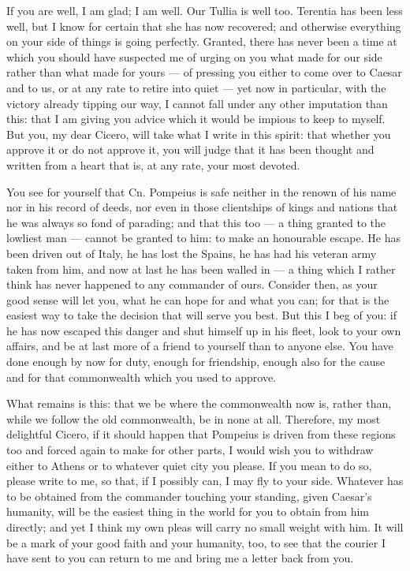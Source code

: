 

 If you are well, I am glad; I am well. Our Tullia is well too. Terentia has been less well, but I know for certain that she has now recovered; and otherwise everything on your side of things is going perfectly. Granted, there has never been a time at which you should have suspected me of urging on you what made for our side rather than what made for yours --- of pressing you either to come over to Caesar and to us, or at any rate to retire into quiet --- yet now in particular, with the victory already tipping our way, I cannot fall under any other imputation than this: that I am giving you advice which it would be impious to keep to myself. But you, my dear Cicero, will take what I write in this spirit: that whether you approve it or do not approve it, you will judge that it has been thought and written from a heart that is, at any rate, your most devoted.

 You see for yourself that Cn. Pompeius is safe neither in the renown of his name nor in his record of deeds, nor even in those clientships of kings and nations that he was always so fond of parading; and that this too --- a thing granted to the lowliest man --- cannot be granted to him: to make an honourable escape. He has been driven out of Italy, he has lost the Spains, he has had his veteran army taken from him, and now at last he has been walled in --- a thing which I rather think has never happened to any commander of ours. Consider then, as your good sense will let you, what he can hope for and what you can; for that is the easiest way to take the decision that will serve you best. But this I beg of you: if he has now escaped this danger and shut himself up in his fleet, look to your own affairs, and be at last more of a friend to yourself than to anyone else. You have done enough by now for duty, enough for friendship, enough also for the cause and for that commonwealth which you used to approve.

 What remains is this: that we be where the commonwealth now is, rather than, while we follow the old commonwealth, be in none at all. Therefore, my most delightful Cicero, if it should happen that Pompeius is driven from these regions too and forced again to make for other parts, I would wish you to withdraw either to Athens or to whatever quiet city you please. If you mean to do so, please write to me, so that, if I possibly can, I may fly to your side. Whatever has to be obtained from the commander touching your standing, given Caesar's humanity, will be the easiest thing in the world for you to obtain from him directly; and yet I think my own pleas will carry no small weight with him. It will be a mark of your good faith and your humanity, too, to see that the courier I have sent to you can return to me and bring me a letter back from you.
